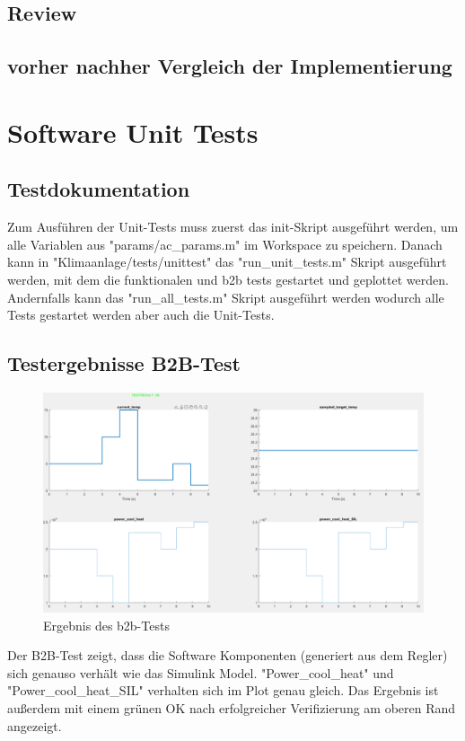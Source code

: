 \documentclass[a4paper,12pt]{article}
\begin{document}
\subsection{Review}
\subsection{vorher nachher Vergleich der Implementierung}

\newpage

\section{Software Unit Tests}
\subsection{Testdokumentation}
Zum Ausführen der Unit-Tests muss zuerst das init-Skript ausgeführt werden, um alle Variablen aus "params/ac\_params.m" im Workspace zu speichern. Danach kann in "Klimaanlage/tests/unittest" das "run\_unit\_tests.m" Skript ausgeführt werden, mit dem die funktionalen und b2b tests gestartet und geplottet werden. 
\\
Andernfalls kann das "run\_all\_tests.m" Skript ausgeführt werden wodurch alle Tests gestartet werden aber auch die Unit-Tests.

\subsection{Testergebnisse B2B-Test}  
\begin{figure}[h!]
	\centering
	\includegraphics[width=\textwidth]{b2b_test.png}
	\caption{Ergebnis des b2b-Tests}
\end{figure}
Der B2B-Test zeigt, dass die Software Komponenten (generiert aus dem Regler) sich genauso verhält wie das Simulink Model. "Power\_cool\_heat" und "Power\_cool\_heat\_SIL" verhalten sich im Plot genau gleich. Das Ergebnis ist außerdem mit einem grünen OK nach erfolgreicher Verifizierung am oberen Rand angezeigt. 
\end{document}
